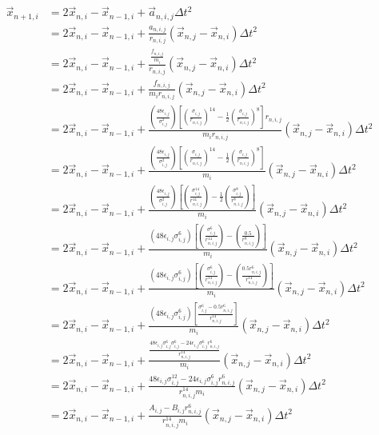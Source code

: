 \documentclass{article}
\begin{document}
\begin{align}
	\vec{x}_{n+1,i}&=2\vec{x}_{n,i}-\vec{x}_{n-1,i}+\vec{a}_{n,i,j}\Delta t^2\\
	&=2\vec{x}_{n,i}-\vec{x}_{n-1,i}+\frac{a_{n,i,j}}{r_{n,i,j}}\left(\vec{x}_{n,j}-\vec{x}_{n,i}\right)\Delta t^2\\
	&=2\vec{x}_{n,i}-\vec{x}_{n-1,i}+\frac{\frac{f_{n,i,j}}{m_i}}{r_{n,i,j}}\left(\vec{x}_{n,j}-\vec{x}_{n,i}\right)\Delta t^2\\
	&=2\vec{x}_{n,i}-\vec{x}_{n-1,i}+\frac{f_{n,i,j}}{m_ir_{n,i,j}}\left(\vec{x}_{n,j}-\vec{x}_{n,i}\right)\Delta t^2\\
	&=2\vec{x}_{n,i}-\vec{x}_{n-1,i}+\frac{\left(\frac{48\epsilon_{i,j}}{\sigma_{i,j}^2}\right)\left[\left(\frac{\sigma_{i,j}}{r_{n,i,j}}\right)^{14}-\frac{1}{2}\left(\frac{\sigma_{i,j}}{r_{n,i,j}}\right)^8\right]r_{n,i,j}}{m_ir_{n,i,j}}\left(\vec{x}_{n,j}-\vec{x}_{n,i}\right)\Delta t^2\\
	&=2\vec{x}_{n,i}-\vec{x}_{n-1,i}+\frac{\left(\frac{48\epsilon_{i,j}}{\sigma_{i,j}^2}\right)\left[\left(\frac{\sigma_{i,j}}{r_{n,i,j}}\right)^{14}-\frac{1}{2}\left(\frac{\sigma_{i,j}}{r_{n,i,j}}\right)^8\right]}{m_i}\left(\vec{x}_{n,j}-\vec{x}_{n,i}\right)\Delta t^2\\
	&=2\vec{x}_{n,i}-\vec{x}_{n-1,i}+\frac{\left(\frac{48\epsilon_{i,j}}{\sigma_{i,j}^2}\right)\left[\left(\frac{\sigma_{i,j}^{14}}{r_{n,i,j}^{14}}\right)-\frac{1}{2}\left(\frac{\sigma_{i,j}^8}{r_{n,i,j}^8}\right)\right]}{m_i}\left(\vec{x}_{n,j}-\vec{x}_{n,i}\right)\Delta t^2\\
	&=2\vec{x}_{n,i}-\vec{x}_{n-1,i}+\frac{\left(48\epsilon_{i,j}\sigma_{i,j}^{6}\right)\left[\left(\frac{\sigma_{i,j}^{6}}{r_{n,i,j}^{14}}\right)-\left(\frac{0.5}{r_{n,i,j}^8}\right)\right]}{m_i}\left(\vec{x}_{n,j}-\vec{x}_{n,i}\right)\Delta t^2\\
	&=2\vec{x}_{n,i}-\vec{x}_{n-1,i}+\frac{\left(48\epsilon_{i,j}\sigma_{i,j}^{6}\right)\left[\left(\frac{\sigma_{i,j}^{6}}{r_{n,i,j}^{14}}\right)-\left(\frac{0.5r_{n,i,j}^6}{r_{n,i,j}^{14}}\right)\right]}{m_i}\left(\vec{x}_{n,j}-\vec{x}_{n,i}\right)\Delta t^2\\
	&=2\vec{x}_{n,i}-\vec{x}_{n-1,i}+\frac{\left(48\epsilon_{i,j}\sigma_{i,j}^{6}\right)\left[\frac{\sigma_{i,j}^{6}-0.5r_{n,i,j}^6}{r_{n,i,j}^{14}}\right]}{m_i}\left(\vec{x}_{n,j}-\vec{x}_{n,i}\right)\Delta t^2\\
	&=2\vec{x}_{n,i}-\vec{x}_{n-1,i}+\frac{\frac{48\epsilon_{i,j}\sigma_{i,j}^{6}\sigma_{i,j}^{6}-24\epsilon_{i,j}\sigma_{i,j}^{6}r_{n,i,j}^6}{r_{n,i,j}^{14}}}{m_i}\left(\vec{x}_{n,j}-\vec{x}_{n,i}\right)\Delta t^2\\
	&=2\vec{x}_{n,i}-\vec{x}_{n-1,i}+\frac{48\epsilon_{i,j}\sigma_{i,j}^{12}-24\epsilon_{i,j}\sigma_{i,j}^{6}r_{n,i,j}^6}{r_{n,i,j}^{14}m_i}\left(\vec{x}_{n,j}-\vec{x}_{n,i}\right)\Delta t^2\\
	&=2\vec{x}_{n,i}-\vec{x}_{n-1,i}+\frac{A_{i,j}-B_{i,j}r_{n,i,j}^6}{r_{n,i,j}^{14}m_i}\left(\vec{x}_{n,j}-\vec{x}_{n,i}\right)\Delta t^2\\
\end{align}
\end{document}
